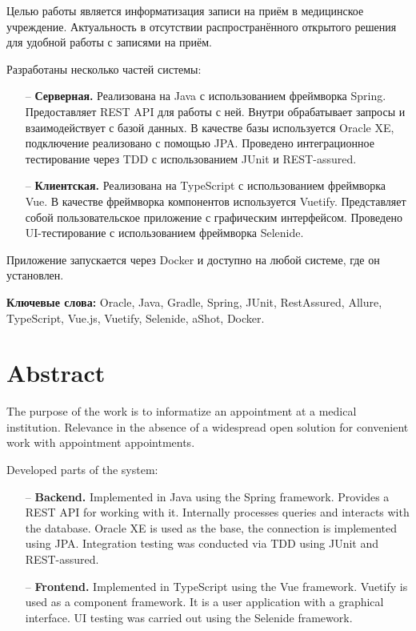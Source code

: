 \documentclass[a4paper,article]{article}
\begin{document}
\begin{sloppypar}
    Целью работы является информатизация записи на приём в медицинское учреждение. Актуальность в отсутствии распространённого открытого решения для удобной работы с записями на приём.

    Разработаны несколько частей системы:

    \begin{itemize}[nolistsep]
		\item[--] \textbf{Серверная.} Реализована на Java с использованием фреймворка Spring. Предоставляет REST API для работы с ней. Внутри обрабатывает запросы и взаимодействует с базой данных. В качестве базы используется Oracle XE, подключение реализовано с помощью JPA. Проведено интеграционное тестирование через TDD с использованием JUnit и REST-assured.
		\item[--] \textbf{Клиентская.} Реализована на TypeScript с использованием фреймворка Vue. В качестве фреймворка компонентов используется Vuetify. Представляет собой пользовательское приложение с графическим интерфейсом. Проведено UI-тестирование с использованием фреймворка Selenide.
	\end{itemize}

	Приложение запускается через Docker и доступно на любой системе, где он установлен.

	\textbf{Ключевые слова:} Oracle, Java, Gradle, Spring, JUnit, RestAssured, Allure, TypeScript, Vue.js, Vuetify, Selenide, aShot, Docker.


    \newpage

    \section*{Abstract}
    

    The purpose of the work is to informatize an appointment at a medical institution. Relevance in the absence of a widespread open solution for convenient work with appointment appointments.

    Developed parts of the system:

    \begin{itemize}[nolistsep]
        \item[--] \textbf{Backend.} Implemented in Java using the Spring framework. Provides a REST API for working with it. Internally processes queries and interacts with the database. Oracle XE is used as the base, the connection is implemented using JPA. Integration testing was conducted via TDD using JUnit and REST-assured.
        \item[--] \textbf{Frontend.} Implemented in TypeScript using the Vue framework. Vuetify is used as a component framework. It is a user application with a graphical interface. UI testing was carried out using the Selenide framework.
    \end{itemize}


\end{sloppypar}
\end{document}
